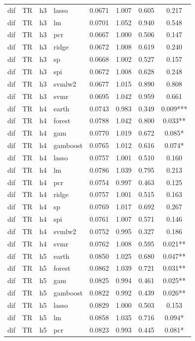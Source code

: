 \begin{ThreePartTable}
\begin{longtable}[t]{llclcccc}
dif & TR & h3 & lasso & 0.0671 & 1.007 & 0.605 & 0.217\\
dif & TR & h3 & lm & 0.0701 & 1.052 & 0.940 & 0.548\\
dif & TR & h3 & pcr & 0.0667 & 1.000 & 0.506 & 0.147\\
dif & TR & h3 & ridge & 0.0672 & 1.008 & 0.619 & 0.240\\
dif & TR & h3 & sp & 0.0668 & 1.002 & 0.527 & 0.157\\
dif & TR & h3 & spi & 0.0672 & 1.008 & 0.628 & 0.248\\
dif & TR & h3 & svmlw2 & 0.0677 & 1.015 & 0.890 & 0.808\\
dif & TR & h3 & svmr & 0.0695 & 1.042 & 0.959 & 0.661\\
\addlinespace
dif & TR & h4 & earth & 0.0743 & 0.983 & 0.349 & 0.009***\\
dif & TR & h4 & forest & 0.0788 & 1.042 & 0.800 & 0.033**\\
dif & TR & h4 & gam & 0.0770 & 1.019 & 0.672 & 0.085*\\
dif & TR & h4 & gamboost & 0.0765 & 1.012 & 0.616 & 0.074*\\
dif & TR & h4 & lasso & 0.0757 & 1.001 & 0.510 & 0.160\\
dif & TR & h4 & lm & 0.0786 & 1.039 & 0.795 & 0.213\\
dif & TR & h4 & pcr & 0.0754 & 0.997 & 0.463 & 0.125\\
dif & TR & h4 & ridge & 0.0757 & 1.001 & 0.515 & 0.163\\
dif & TR & h4 & sp & 0.0769 & 1.017 & 0.692 & 0.267\\
dif & TR & h4 & spi & 0.0761 & 1.007 & 0.571 & 0.146\\
dif & TR & h4 & svmlw2 & 0.0752 & 0.995 & 0.327 & 0.186\\
dif & TR & h4 & svmr & 0.0762 & 1.008 & 0.595 & 0.021**\\
\addlinespace
dif & TR & h5 & earth & 0.0850 & 1.025 & 0.680 & 0.047**\\
dif & TR & h5 & forest & 0.0862 & 1.039 & 0.721 & 0.031**\\
dif & TR & h5 & gam & 0.0825 & 0.994 & 0.461 & 0.025**\\
dif & TR & h5 & gamboost & 0.0822 & 0.992 & 0.439 & 0.026**\\
dif & TR & h5 & lasso & 0.0829 & 1.000 & 0.503 & 0.153\\
dif & TR & h5 & lm & 0.0858 & 1.035 & 0.716 & 0.094*\\
dif & TR & h5 & pcr & 0.0823 & 0.993 & 0.445 & 0.081*\\

\end{longtable}
\end{ThreePartTable}
